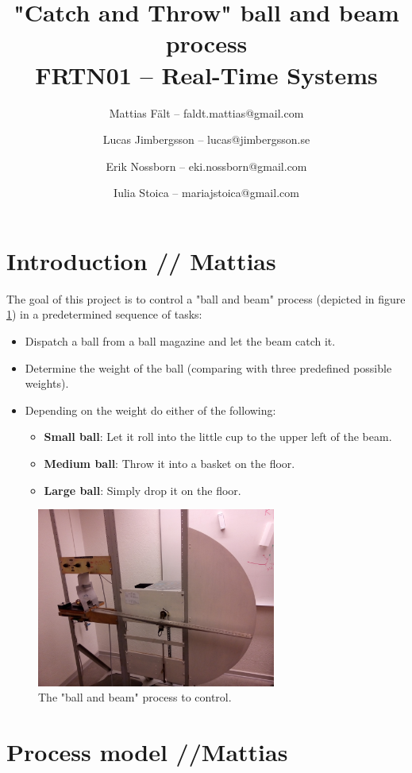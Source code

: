 \documentclass{article}
\title{"Catch and Throw" ball and beam process\\FRTN01 -- Real-Time Systems}
\author{
Mattias Fält -- faldt.mattias@gmail.com
\and
Lucas Jimbergsson -- lucas@jimbergsson.se
\and
Erik Nossborn -- eki.nossborn@gmail.com
\and
Iulia Stoica -- mariajstoica@gmail.com
}
\begin{document}
\maketitle
\newpage

\tableofcontents
\newpage

\section{Introduction // Mattias}
The goal of this project is to control a "ball and beam" process (depicted in figure \ref{process_fig}) in a predetermined sequence of tasks:
\begin{itemize}
\item Dispatch a ball from a ball magazine and let the beam catch it.
\item Determine the weight of the ball (comparing with three predefined possible weights).
\item Depending on the weight do either of the following:
\begin{itemize}
\item \textbf{Small ball}: Let it roll into the little cup to the upper left of the beam.
\item \textbf{Medium ball}: Throw it into a basket on the floor.
\item \textbf{Large ball}: Simply drop it on the floor.
\end{itemize}
\end{itemize}
\begin{figure}
\centering
\includegraphics[width=0.7\textwidth]{figures/process_fig.jpg}
\caption{The "ball and beam" process to control.}\label{process_fig}
\end{figure}

\section{Process model //Mattias}

\end{document}
